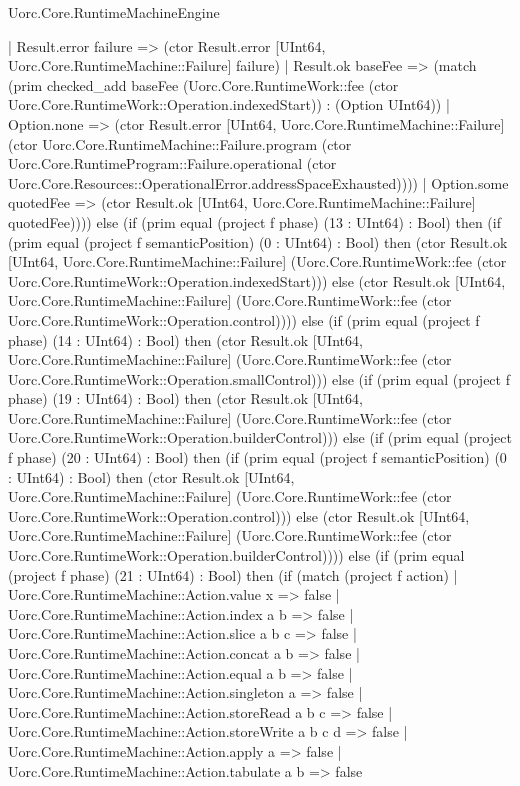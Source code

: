 \begin{lexlean}{Uorc.Core.RuntimeMachineEngine}
\begin{semanticmodule}
{      | Result.error failure => (ctor Result.error [UInt64, Uorc.Core.RuntimeMachine::Failure] failure)
      | Result.ok baseFee => (match (prim checked_add baseFee (Uorc.Core.RuntimeWork::fee (ctor Uorc.Core.RuntimeWork::Operation.indexedStart)) : (Option UInt64))
        | Option.none => (ctor Result.error [UInt64, Uorc.Core.RuntimeMachine::Failure] (ctor Uorc.Core.RuntimeMachine::Failure.program (ctor Uorc.Core.RuntimeProgram::Failure.operational (ctor Uorc.Core.Resources::OperationalError.addressSpaceExhausted))))
        | Option.some quotedFee => (ctor Result.ok [UInt64, Uorc.Core.RuntimeMachine::Failure] quotedFee)))) else (if (prim equal (project f phase) (13 : UInt64) : Bool) then (if (prim equal (project f semanticPosition) (0 : UInt64) : Bool) then (ctor Result.ok [UInt64, Uorc.Core.RuntimeMachine::Failure] (Uorc.Core.RuntimeWork::fee (ctor Uorc.Core.RuntimeWork::Operation.indexedStart))) else (ctor Result.ok [UInt64, Uorc.Core.RuntimeMachine::Failure] (Uorc.Core.RuntimeWork::fee (ctor Uorc.Core.RuntimeWork::Operation.control)))) else (if (prim equal (project f phase) (14 : UInt64) : Bool) then (ctor Result.ok [UInt64, Uorc.Core.RuntimeMachine::Failure] (Uorc.Core.RuntimeWork::fee (ctor Uorc.Core.RuntimeWork::Operation.smallControl))) else (if (prim equal (project f phase) (19 : UInt64) : Bool) then (ctor Result.ok [UInt64, Uorc.Core.RuntimeMachine::Failure] (Uorc.Core.RuntimeWork::fee (ctor Uorc.Core.RuntimeWork::Operation.builderControl))) else (if (prim equal (project f phase) (20 : UInt64) : Bool) then (if (prim equal (project f semanticPosition) (0 : UInt64) : Bool) then (ctor Result.ok [UInt64, Uorc.Core.RuntimeMachine::Failure] (Uorc.Core.RuntimeWork::fee (ctor Uorc.Core.RuntimeWork::Operation.control))) else (ctor Result.ok [UInt64, Uorc.Core.RuntimeMachine::Failure] (Uorc.Core.RuntimeWork::fee (ctor Uorc.Core.RuntimeWork::Operation.builderControl)))) else (if (prim equal (project f phase) (21 : UInt64) : Bool) then (if (match (project f action)
      | Uorc.Core.RuntimeMachine::Action.value x => false
      | Uorc.Core.RuntimeMachine::Action.index a b => false
      | Uorc.Core.RuntimeMachine::Action.slice a b c => false
      | Uorc.Core.RuntimeMachine::Action.concat a b => false
      | Uorc.Core.RuntimeMachine::Action.equal a b => false
      | Uorc.Core.RuntimeMachine::Action.singleton a => false
      | Uorc.Core.RuntimeMachine::Action.storeRead a b c => false
      | Uorc.Core.RuntimeMachine::Action.storeWrite a b c d => false
      | Uorc.Core.RuntimeMachine::Action.apply a => false
      | Uorc.Core.RuntimeMachine::Action.tabulate a b => false
}
\end{semanticmodule}
\end{lexlean}
